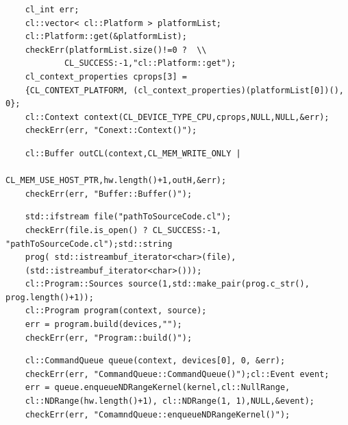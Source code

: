 \begin{lstlisting}
	cl_int err;
	cl::vector< cl::Platform > platformList;
	cl::Platform::get(&platformList);
	checkErr(platformList.size()!=0 ?  \\
			CL_SUCCESS:-1,"cl::Platform::get");
	cl_context_properties cprops[3] =
	{CL_CONTEXT_PLATFORM, (cl_context_properties)(platformList[0])(), 0};
	cl::Context context(CL_DEVICE_TYPE_CPU,cprops,NULL,NULL,&err);
	checkErr(err, "Conext::Context()"); 
\end{lstlisting}
 
\begin{lstlisting}
	cl::Buffer outCL(context,CL_MEM_WRITE_ONLY |
                          		CL_MEM_USE_HOST_PTR,hw.length()+1,outH,&err);
    checkErr(err, "Buffer::Buffer()");
\end{lstlisting}
 
\begin{lstlisting}
	std::ifstream file("pathToSourceCode.cl");
	checkErr(file.is_open() ? CL_SUCCESS:-1, "pathToSourceCode.cl");std::string
	prog( std::istreambuf_iterator<char>(file),
	(std::istreambuf_iterator<char>()));
	cl::Program::Sources source(1,std::make_pair(prog.c_str(), prog.length()+1));
	cl::Program program(context, source);
	err = program.build(devices,"");
	checkErr(err, "Program::build()");
\end{lstlisting}
 
\begin{lstlisting}
	cl::CommandQueue queue(context, devices[0], 0, &err);
	checkErr(err, "CommandQueue::CommandQueue()");cl::Event event;
	err = queue.enqueueNDRangeKernel(kernel,cl::NullRange,
	cl::NDRange(hw.length()+1),	cl::NDRange(1, 1),NULL,&event);
	checkErr(err, "ComamndQueue::enqueueNDRangeKernel()");
\end{lstlisting}





